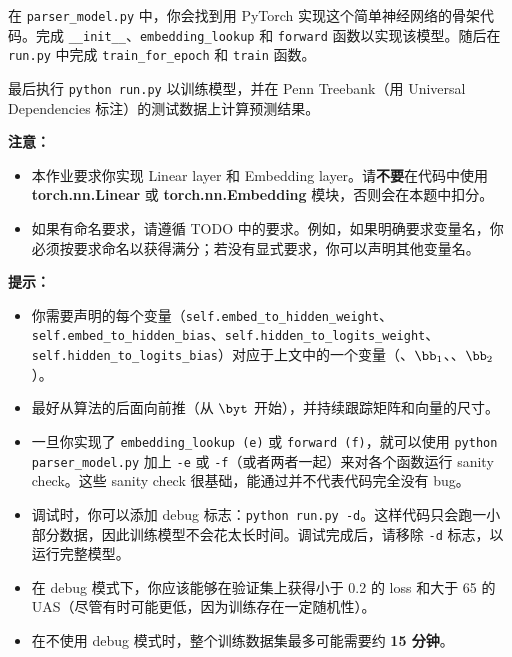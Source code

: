 \begin{parts}
\begin{enumerate}[label=\roman*.]
   在 \texttt{parser\_model.py} 中，你会找到用 PyTorch 实现这个简单神经网络的骨架代码。完成 \texttt{\_\_init\_\_}、\texttt{embedding\_lookup} 和 \texttt{forward} 函数以实现该模型。随后在 \texttt{run.py} 中完成 \texttt{train\_for\_epoch} 和 \texttt{train} 函数。
   
    最后执行 \texttt{python run.py} 以训练模型，并在 Penn Treebank（用 Universal Dependencies 标注）的测试数据上计算预测结果。
    
    \textbf{注意：}
    \begin{itemize}
        \item 本作业要求你实现 Linear layer 和 Embedding layer。请\textbf{不要}在代码中使用 \textbf{torch.nn.Linear} 或 \textbf{torch.nn.Embedding} 模块，否则会在本题中扣分。
        \item 如果有命名要求，请遵循 TODO 中的要求。例如，如果明确要求变量名，你必须按要求命名以获得满分；若没有显式要求，你可以声明其他变量名。
    \end{itemize}
    
    \textbf{提示：}
    \begin{itemize}
        \item 你需要声明的每个变量（\texttt{self.embed\_to\_hidden\_weight}、\newline \texttt{self.embed\_to\_hidden\_bias}、\texttt{self.hidden\_to\_logits\_weight}、\newline \texttt{self.hidden\_to\_logits\_bias}）对应于上文中的一个变量（\bW、$\bb_1$、\bU、$\bb_2$）。
        \item 最好从算法的后面向前推（从 $\byt$ 开始），并持续跟踪矩阵和向量的尺寸。
        \item 一旦你实现了 \texttt{embedding\_lookup (e)} 或 \texttt{forward (f)}，就可以使用 \texttt{python parser\_model.py} 加上 \texttt{-e} 或 \texttt{-f}（或者两者一起）来对各个函数运行 sanity check。这些 sanity check 很基础，能通过并不代表代码完全没有 bug。
        \item
            调试时，你可以添加 debug 标志：\texttt{python run.py -d}。这样代码只会跑一小部分数据，因此训练模型不会花太长时间。调试完成后，请移除 \texttt{-d} 标志，以运行完整模型。

        \item
            在 debug 模式下，你应该能够在验证集上获得小于 0.2 的 loss 和大于 65 的 UAS（尽管有时可能更低，因为训练存在一定随机性）。
        
        \item 在不使用 debug 模式时，整个训练数据集最多可能需要约 \textbf{15 分钟}。
        

\end{itemize}
\end{enumerate}
\end{parts}
